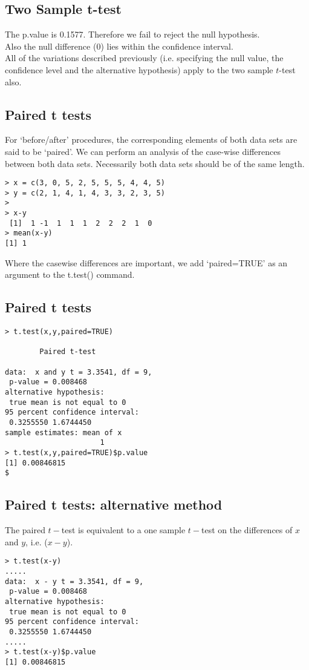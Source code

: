 \documentclass[a4paper,12pt]{article}
\begin{document}
\subsection{Two Sample t-test}
The p.value is 0.1577. Therefore we fail to reject the null hypothesis.\\
Also the null difference (0) lies within the confidence interval.\\

All of the variations described previously (i.e. specifying the null value, the confidence level and the alternative hypothesis)
apply to the two sample $t$-test also.

\subsection{Paired t tests}
For `before/after' procedures, the corresponding elements of both data sets are said to be `paired'.
We can perform an analysis of the case-wise differences between both data sets.
Necessarily both data sets should be of the same length.
\begin{verbatim}
> x = c(3, 0, 5, 2, 5, 5, 5, 4, 4, 5)
> y = c(2, 1, 4, 1, 4, 3, 3, 2, 3, 5)
>
> x-y
 [1]  1 -1  1  1  1  2  2  2  1  0
> mean(x-y)
[1] 1
\end{verbatim}
Where the casewise differences are important, we add `paired=TRUE' as an argument to the t.test() command.
\subsection{Paired t tests}
\begin{verbatim}
> t.test(x,y,paired=TRUE)

        Paired t-test

data:  x and y t = 3.3541, df = 9,
 p-value = 0.008468
alternative hypothesis:
 true mean is not equal to 0
95 percent confidence interval:
 0.3255550 1.6744450
sample estimates: mean of x
                      1
> t.test(x,y,paired=TRUE)$p.value
[1] 0.00846815                                                               $
\end{verbatim}
\subsection{Paired t tests: alternative method}
The paired $t-$test is equivalent to a one sample $t-$test on the differences of $x$ and $y$, i.e. ($x-y$).
\begin{verbatim}
> t.test(x-y)
.....
data:  x - y t = 3.3541, df = 9,
 p-value = 0.008468
alternative hypothesis:
 true mean is not equal to 0
95 percent confidence interval:
 0.3255550 1.6744450
.....
> t.test(x-y)$p.value
[1] 0.00846815
\end{verbatim}
\end{document}
